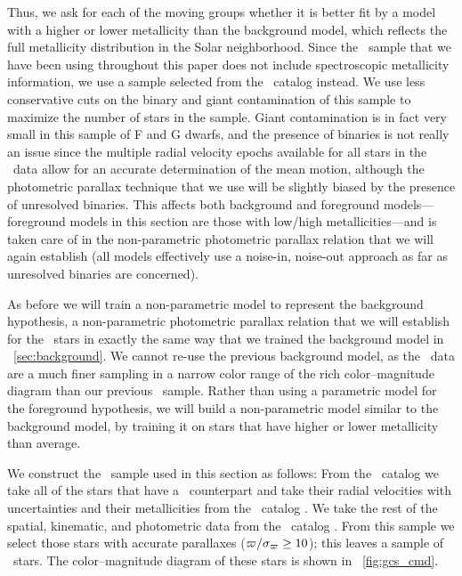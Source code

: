 Thus, we ask for each of the moving groups whether it is better fit by
a model with a higher or lower metallicity than the background model,
which reflects the full metallicity distribution in the Solar
neighborhood. Since the \Hipparcos\ sample that we have been using
throughout this paper does not include spectroscopic metallicity
information, we use a sample selected from the \gcsabb\ catalog
instead. We use less conservative cuts on the binary and giant
contamination of this sample to maximize the number of stars in the
sample. Giant contamination is in fact very small in this sample of F
and G dwarfs, and the presence of binaries is not really an issue
since the multiple radial velocity epochs available for all stars in
the \gcsabb\ data allow for an accurate determination of the mean
motion, although the photometric parallax technique that we use will
be slightly biased by the presence of unresolved binaries. This
affects both background and foreground models---foreground models in
this section are those with low/high metallicities---and is taken care
of in the non-parametric photometric parallax relation that we will
again establish (all models effectively use a noise-in, noise-out
approach as far as unresolved binaries are concerned).

As before we will train a non-parametric model to represent the
background hypothesis, a non-parametric photometric parallax relation
that we will establish for the \gcsabb\ stars in exactly the same way
that we trained the background model in
\sectionname~\ref{sec:background}. We cannot re-use the previous
background model, as the \gcsabb\ data are a much finer sampling in a
narrow color range of the rich color--magnitude diagram than our
previous \Hipparcos\ sample. Rather than using a parametric model for
the foreground hypothesis, we will build a non-parametric model
similar to the background model, by training it on stars that have
higher or lower metallicity than average.

We construct the \gcsabb\ sample used in this section as follows: From
the \gcsabb\ catalog we take all of the stars that have a
\Hipparcos\ counterpart and take their radial velocities with
uncertainties and their metallicities from the \gcsabb\ catalog
\citep[the latest reduction;][]{Holmberg07a,Holmberg09a}. We take the
rest of the spatial, kinematic, and photometric data from the
\Hipparcos\ catalog \citep{ESA97a,2007ASSL..250.....V}. From this sample we
select those stars with accurate parallaxes
($\varpi/\sigma_{\varpi} \geq 10$); this leaves a sample of
\ngcsstars\ stars. The color--magnitude diagram of these stars is
shown in \figurename~\ref{fig:gcs_cmd}.

